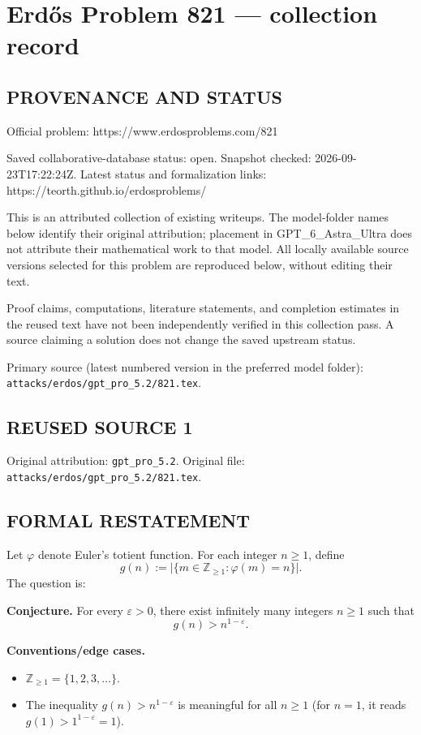 \section*{Erd\H{o}s Problem 821 --- collection record}

\subsection*{PROVENANCE AND STATUS}
Official problem: https://www.erdosproblems.com/821

Saved collaborative-database status: open.
Snapshot checked: 2026-09-23T17:22:24Z.
Latest status and formalization links: https://teorth.github.io/erdosproblems/

This is an attributed collection of existing writeups. The model-folder names below identify their original attribution; placement in GPT\_6\_Astra\_Ultra does not attribute their mathematical work to that model. All locally available source versions selected for this problem are reproduced below, without editing their text.

Proof claims, computations, literature statements, and completion estimates in the reused text have not been independently verified in this collection pass. A source claiming a solution does not change the saved upstream status.

Primary source (latest numbered version in the preferred model folder): \texttt{attacks/erdos/gpt\_pro\_5.2/821.tex}.

\subsection*{REUSED SOURCE 1}
Original attribution: \texttt{gpt\_pro\_5.2}.
Original file: \texttt{attacks/erdos/gpt\_pro\_5.2/821.tex}.



\subsection*{FORMAL RESTATEMENT}
Let $\varphi$ denote Euler's totient function. For each integer $n\ge 1$, define
\[
 g(n) := \bigl|\{m\in\mathbb{Z}_{\ge 1} : \varphi(m)=n\}\bigr|.
\]
The question is:

\medskip
\noindent\textbf{Conjecture.} For every $\varepsilon>0$, there exist infinitely many integers $n\ge 1$ such that
\[
 g(n) > n^{1-\varepsilon}.
\]

\medskip
\noindent\textbf{Conventions/edge cases.}
\begin{itemize}
\item $\mathbb{Z}_{\ge 1}=\{1,2,3,\dots\}$.
\item The inequality $g(n) > n^{1-\varepsilon}$ is meaningful for all $n\ge 1$ (for $n=1$, it reads $g(1)>1^{1-\varepsilon}=1$).
\end{itemize}

